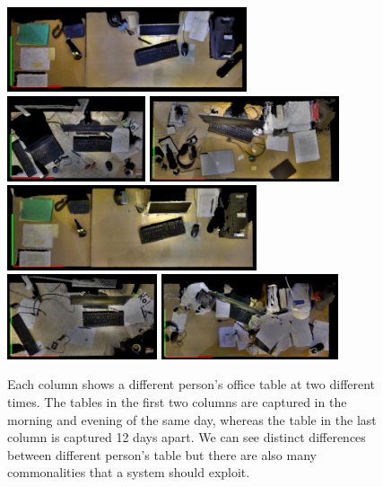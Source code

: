 \documentclass[letterpaper, 10 pt, conference]{ieeeconf}  %
\begin{document}
\begin{figure}[bhtp]
\begin{center}
\includegraphics[height=2.5cm]{David_Mor_131110} \quad
\includegraphics[height=2.5cm]{Nils_Mor_131111} \quad
\includegraphics[height=2.5cm]{Puren_Eve_131029}\\ \smallskip
\includegraphics[height=2.5cm]{David_Eve_131110} \enskip
\includegraphics[height=2.5cm]{Nils_Eve_131111} \enskip
\includegraphics[height=2.5cm]{Puren_Mor_131110}
\caption{Each column shows a different person's office table at two different times. The tables in the first two columns are captured in the morning and evening of the same day, whereas the table in the last column is captured 12 days apart. We can see distinct differences between different person's table but there are also many commonalities that a system should exploit.}
\label{fig:Example Scenes}
\end{center}
\end{figure}
\end{document}
